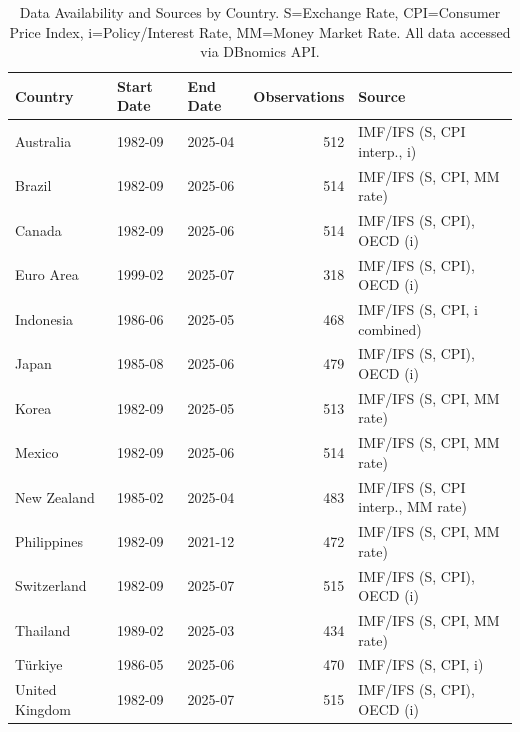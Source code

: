 \begin{table}
\caption{Data Availability and Sources by Country. S=Exchange Rate, CPI=Consumer Price Index, i=Policy/Interest Rate, MM=Money Market Rate. All data accessed via DBnomics API.}
\label{tab:data_availability}
\begin{tabular}{lllrl}
\toprule
Country & Start Date & End Date & Observations & Source \\
\midrule
Australia & 1982-09 & 2025-04 & 512 & IMF/IFS (S, CPI interp., i) \\
Brazil & 1982-09 & 2025-06 & 514 & IMF/IFS (S, CPI, MM rate) \\
Canada & 1982-09 & 2025-06 & 514 & IMF/IFS (S, CPI), OECD (i) \\
Euro Area & 1999-02 & 2025-07 & 318 & IMF/IFS (S, CPI), OECD (i) \\
Indonesia & 1986-06 & 2025-05 & 468 & IMF/IFS (S, CPI, i combined) \\
Japan & 1985-08 & 2025-06 & 479 & IMF/IFS (S, CPI), OECD (i) \\
Korea & 1982-09 & 2025-05 & 513 & IMF/IFS (S, CPI, MM rate) \\
Mexico & 1982-09 & 2025-06 & 514 & IMF/IFS (S, CPI, MM rate) \\
New Zealand & 1985-02 & 2025-04 & 483 & IMF/IFS (S, CPI interp., MM rate) \\
Philippines & 1982-09 & 2021-12 & 472 & IMF/IFS (S, CPI, MM rate) \\
Switzerland & 1982-09 & 2025-07 & 515 & IMF/IFS (S, CPI), OECD (i) \\
Thailand & 1989-02 & 2025-03 & 434 & IMF/IFS (S, CPI, MM rate) \\
Türkiye & 1986-05 & 2025-06 & 470 & IMF/IFS (S, CPI, i) \\
United Kingdom & 1982-09 & 2025-07 & 515 & IMF/IFS (S, CPI), OECD (i) \\
\bottomrule
\end{tabular}
\end{table}
